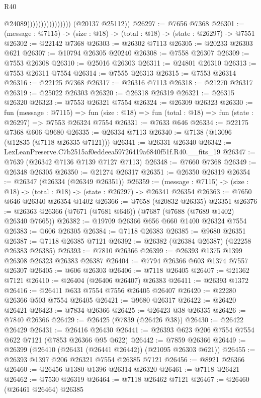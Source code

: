\begin{lexlean}{R40}
\begin{coremodule}
                                      @24089))))))))))))))))
      (@20137 @25112))
@26297 := @7656 @7368
@26301 := (message : @7115) -> (size : @18) -> (total : @18) -> (state : @26297) -> @7551
@26302 := @22142 @7368
@26303 := @26302 @7113
@26305 := @20233 @26303 @621
@26307 := @10794 @26305 @20240
@26308 := @7558 @26307
@26309 := @7553 @26308
@26310 := @25016 @26303
@26311 := @24801 @26310
@26313 := @7553 @26311 @7554
@26314 := @7555 @26313
@26315 := @7553 @26314
@26316 := @22125 @7368
@26317 := @26316 @7113
@26318 := @21270 @26317
@26319 := @25022 @26303
@26320 := @26318 @26319
@26321 := @26315 @26320
@26323 := @7553 @26321 @7554
@26324 := @26309 @26323
@26330 := fun (message : @7115) =>
  fun (size : @18) => fun (total : @18) => fun (state : @26297) => @7553 @26324 @7554
@26331 := @7633 @646
@26334 := @22175 @7368 @606 @9680
@26335 := @26334 @7113
@26340 := @7138 (@13096 (@12835 (@7118 @26335 @7121)))
@26341 := @26331 @26340
@26342 := LexLeanPreserve.C7b2515af0eddeea59726419a6840f51f.R40.__fits_19
@26347 := @7639 (@26342 @7136 @7139 @7127 @7113)
@26348 := @7660 @7368
@26349 := @26348 @26305
@26350 := @21274 @26317
@26351 := @26350 @26319
@26354 := @26347 (@26334 (@26349 @26351))
@26359 := (message : @7115) -> (size : @18) -> (total : @18) -> (state : @26297) -> @26341 @26354
@26363 := @7650 @646 @26340 @26354 @1402
@26366 := @7658 (@20832 @26335) @23351
@26376 := @26363 @26366 (@7671 (@7681 @646)) (@7687 (@7688 (@7689 @1402) @26340 @7665))
@26382 := @19709 @26366 @656 @660 @1400 @26324 @7554
@26383 := @606 @26305
@26384 := @7118 @26383
@26385 := @9680 @26351
@26387 := @7118 @26385 @7121
@26392 := @26382 (@26384 @26387) (@22258 @26383 @26385)
@26393 := @7810 @26366
@26399 := @26393 @1375 @1399 @26308 @26323 @26383 @26387
@26404 := @7794 @26366 @603 @1374 @7557 @26307
@26405 := @606 @26303
@26406 := @7118 @26405
@26407 := @21362 @7121
@26410 := @26404 (@26406 @26407) @26383
@26411 := @26393 @1372
@26416 := @26411 @633 @7554 @7556 @26405 @26407
@26420 := @22280 @26366 @503 @7554 @26405
@26421 := @9680 @26317
@26422 := @26420 @26421
@26423 := @7834 @26366
@26425 := @26423 @38 @26335
@26426 := @7840 @26366
@26429 := @26425 (@7839 (@26426 @38))
@26430 := @26422 @26429
@26431 := @26416 @26430
@26441 := @26393 @623 @206 @7554 @7554 @622 @7121 (@7853 @26366 @95 @622)
@26442 := @7859 @26366
@26449 := @26399 (@26410 (@26431 (@26441 @26442)) (@21095 @26303 @621))
@26455 := @26393 @1397 @206 @26321 @7554 @26385 @7121
@26456 := @8921 @26366
@26460 := @26456 @1380 @1396 @26314 @26320
@26461 := @7118 @26421
@26462 := @7530 @26319
@26464 := @7118 @26462 @7121
@26467 := @26460 (@26461 @26464) @26385

\end{coremodule}
\end{lexlean}
